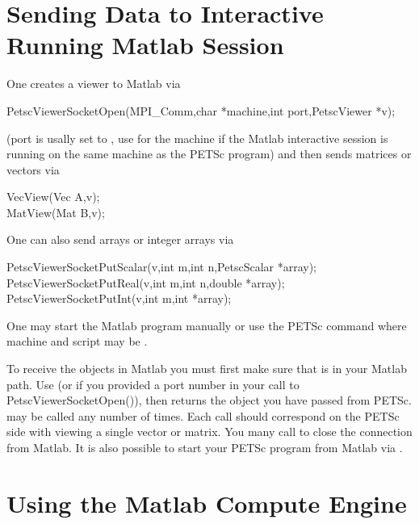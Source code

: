 \section{Sending Data to Interactive Running Matlab Session}

One creates a viewer to Matlab via 
\begin{tabbing}
PetscViewerSocketOpen(MPI\_Comm,char *machine,int port,PetscViewer *v);
\end{tabbing}
(port is usally set to , use  for the machine if the 
Matlab interactive session is running on the same machine as the PETSc program) 
and then sends matrices or vectors via
\begin{tabbing}
  VecView(Vec A,v);\\
  MatView(Mat B,v);
\end{tabbing}
One can also send arrays or integer arrays via
\begin{tabbing}
  PetscViewerSocketPutScalar(v,int m,int n,PetscScalar *array);\\
  PetscViewerSocketPutReal(v,int m,int n,double *array);\\
  PetscViewerSocketPutInt(v,int m,int *array);
\end{tabbing}
One may start the Matlab program manually or use the PETSc command
 where machine and script may be .

To receive the objects in Matlab you must first make sure that 
is in your Matlab path. Use  (or  if you provided a port number in
your call to PetscViewerSocketOpen()), then  returns the object you have passed from PETSc.
 may be called any number of times. Each call should correspond on the PETSc side with
viewing a single vector or matrix. You many call  to close the connection from Matlab.
It is also possible to start your PETSc program from Matlab via .

\section{Using the Matlab Compute Engine}

